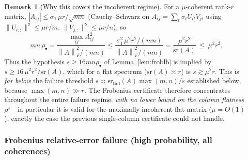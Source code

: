 \documentclass{amsart}
\theoremstyle{definition}
\newtheorem{remark}{Remark}
\newcommand{\Frob}[1]{\left\lVert #1\right\rVert_F}
\begin{document}
\begin{remark}[Why this covers the incoherent regime]\label{rem:incoh}
For a $\mu$-coherent rank-$r$ matrix, $|A_{ij}|\le\sigma_1\,\mu r/\sqrt{mn}$
(Cauchy--Schwarz on $A_{ij}=\sum_t\sigma_tU_{it}V_{jt}$ using
$\|U_{i,:}\|^2\le\mu r/m$, $\|V_{j,:}\|^2\le\mu r/n$), so
\[
mn\,\rho_\bullet=\frac{\max_{ij}A_{ij}^2}{\Frob A^2/(mn)}
\le\frac{\sigma_1^2\,\mu^2 r^2/(mn)}{\Frob A^2/(mn)}
=\frac{\mu^2 r^2}{\mathrm{sr}(A)}\ \le\ \mu^2 r^2 .
\]
Thus the hypothesis $s\ge16mn\rho_\bullet$ of Lemma~\ref{lem:froblb} is implied by
$s\ge16\,\mu^2 r^2/\mathrm{sr}(A)$, which for a flat spectrum
($\mathrm{sr}(A)\asymp r$) is $s\gtrsim\mu^2 r$. This is \emph{far below} the
failure threshold $s\asymp\mathrm{sr}_{\mathrm{tail}}(A)\max(m,n)/\varepsilon$
established below, because $\max(m,n)\gg r$. The Frobenius certificate therefore
concentrates throughout the entire failure regime, \emph{with no lower bound on
the column flatness} $\rho^\star$---in particular it is valid for the maximally
incoherent flat matrix ($\mu=\Theta(1)$), exactly the case the previous
single-column certificate could not handle.
\end{remark}

\subsubsection*{Frobenius relative-error failure (high probability, all coherences)}
\end{document}
